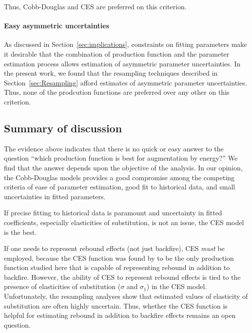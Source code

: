 \documentclass[preprint,authoryear,12pt]{elsarticle}\usepackage[]{graphicx}\usepackage[]{color}
\begin{document}
Thus, Cobb-Douglas and CES are preferred on this criterion.


\paragraph{Easy asymmetric uncertainties} 
\label{sec:asymmetric_uncertainty}

As discussed in Section~\ref{sec:implications},
constraints on fitting parameters make it 
desirable that the combination of production function
and the parameter estimation process
allows estimation of asymmetric parameter uncertainties.
In the present work, we found that the resampling techniques described 
in Section~\ref{sec:Resampling} afford estimates 
of asymmetric parameter uncertainties. 
Thus, none of the prodcution functions are preferred over any other on this criterion.


\subsection{Summary of discussion} 
\label{sec:summary_of_discussion}

The evidence above indicates that 
there is no quick or easy answer to the question
``which production function is best for augmentation by energy?''
We find that the answer depends upon the objective of the analysis.
In our opinion, 
the Cobb-Douglas models provides a good compromise among the competing criteria of
ease of parameter estimation, good fit to historical data, and
small uncertainties in fitted parameters. 

If precise fitting to historical data is paramount and uncertainty
in fitted coefficients, especially elasticities of substitution, is not an issue, 
the CES model is the best.

If one needs to represent rebound effects (not just backfire), 
CES \emph{must} be employed, 
because the CES function was found by \citet{Saunders:2008aa} to be the only production
function studied here that is capable of representing rebound in addition to backfire.
However, the ability of CES to represent rebound effects 
is tied to the presence of elasticities of substitution ($\sigma$ and $\sigma_1$) in the CES model.
Unfortunately, the resampling analyses show that estimated values 
of elasticity of substitution are often highly uncertain.
Thus, whether the CES function is helpful for estimating rebound in addition to backfire effects
remains an open question.
\end{document}
